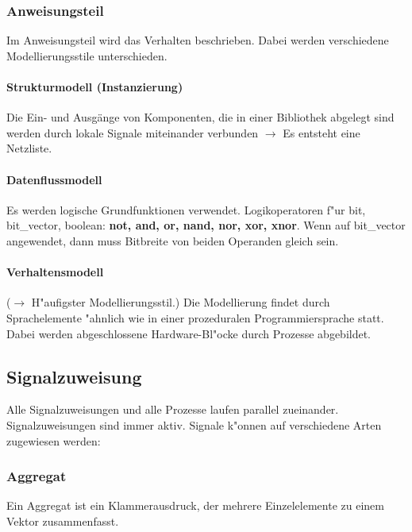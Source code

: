\vspace{-\baselineskip}
\begin{multicols}{2}
	\subsubsection{Anweisungsteil}
	Im Anweisungsteil wird das Verhalten beschrieben. Dabei werden verschiedene Modellierungsstile unterschieden.
	\paragraph{Strukturmodell (Instanzierung)}
	Die Ein- und Ausgänge von Komponenten, die in einer Bibliothek abgelegt sind werden durch lokale Signale miteinander verbunden $\rightarrow$ Es entsteht eine Netzliste. 
	
	\paragraph{Datenflussmodell}
	Es werden logische Grundfunktionen verwendet.
	Logikoperatoren f"ur bit, bit\_vector, boolean: \textbf{not, and, or, nand, nor, xor, xnor}. Wenn auf bit\_vector angewendet, dann muss Bitbreite von beiden Operanden gleich sein.
	
	\paragraph{Verhaltensmodell} ($\rightarrow$ H"aufigster Modellierungsstil.) 
	Die Modellierung findet durch Sprachelemente "ahnlich wie in einer prozeduralen Programmiersprache statt. Dabei werden abgeschlossene Hardware-Bl"ocke durch Prozesse 
	abgebildet.
\end{multicols}
			
\begin{multicols}{2}
	\subsection{Signalzuweisung}
	Alle Signalzuweisungen und alle Prozesse laufen parallel zueinander. Signalzuweisungen sind immer aktiv. Signale k"onnen auf verschiedene Arten zugewiesen werden:
	
	\subsubsection{Aggregat}
	Ein Aggregat ist ein Klammerausdruck, der mehrere Einzelelemente zu einem Vektor zusammenfasst.
		
\end{multicols}
	
